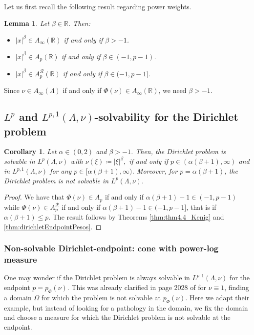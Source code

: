 \documentclass[12pt]{amsart}
\newcommand{\R}{\mathbb{R}}
\theoremstyle{plain}
\newtheorem{corollary}[theorem]{Corollary}
\newtheorem{lemma}[theorem]{Lemma}
\theoremstyle{definition}
\numberwithin{equation}{section}
\begin{document}
Let us first recall the following result regarding power weights.

\begin{lemma}\label{lemma:powerWeights}
    Let $\beta\in\R$. Then:
    \begin{itemize}
        \item $|x|^{\beta}\in A_{\infty}(\R)$ if and only if $\beta>-1$.
        \item $|x|^{\beta}\in A_{p}(\R)$ if and only if $\beta\in (-1,p-1)$.
        \item $|x|^{\beta}\in A_{p}^{\mathcal{R}}(\R)$ if and only if $\beta\in (-1,p-1]$.
    \end{itemize}
\end{lemma}

Since $\nu\in A_{\infty}(\Lambda)$ if and only if $\Phi(\nu)\in A_{\infty}(\R)$, we need  $\beta>-1$. 

\subsection{\texorpdfstring{$L^{p}$ and $L^{p,1}(\Lambda,\nu)$}{}-solvability for the Dirichlet problem}


\begin{corollary}\label{corol:ejemploDirichlet}
Let  $\alpha\in (0,2)$ and  $\beta>-1$. Then, the Dirichlet problem is solvable in $L^p(\Lambda,\nu)$  with $\nu(\xi)
\coloneqq 
|\xi|^{\beta},$ if and only if $p\in (\alpha(\beta+1),\infty)$ and in $L^{p,1}(\Lambda,\nu)$ for any $p\in [\alpha(\beta+1),\infty)$.  Moreover, for $p=\alpha(\beta+1)$, the Dirichlet problem is not solvable in $L^p(\Lambda,\nu)$. 
\end{corollary}
\begin{proof} We have that   $\Phi(\nu)\in A_{p}$ if and only if $\alpha(\beta+1)-1\in (-1,p-1)$ while $\Phi(\nu)\in A_{p}^{\mathcal{R}}$ if and only if $\alpha(\beta+1)-1\in (-1,p-1]$, that is if $\alpha(\beta+1)\leq p$. The result follows by Theorems \ref{thm:thm4.4_Kenig} and \ref{thm:dirichletEndpointPesos}.
\end{proof}








\subsubsection{Non-solvable Dirichlet-endpoint: cone with power-log measure}

One may wonder if the Dirichlet problem is always solvable in $L^{p,1}(\Lambda,\nu)$ for the endpoint $p=p_{\Phi}(\nu)$. This was already clarified in page 2028 of \cite{CarroOrtiz} for $\nu\equiv 1$, finding a domain $\Omega$ for which the problem is not solvable at $p_{\Phi}(\nu)$. Here we adapt their example, but instead of looking for a pathology in the domain, we fix the domain and choose a measure for which the Dirichlet problem is not solvable at the endpoint.
\end{document}
